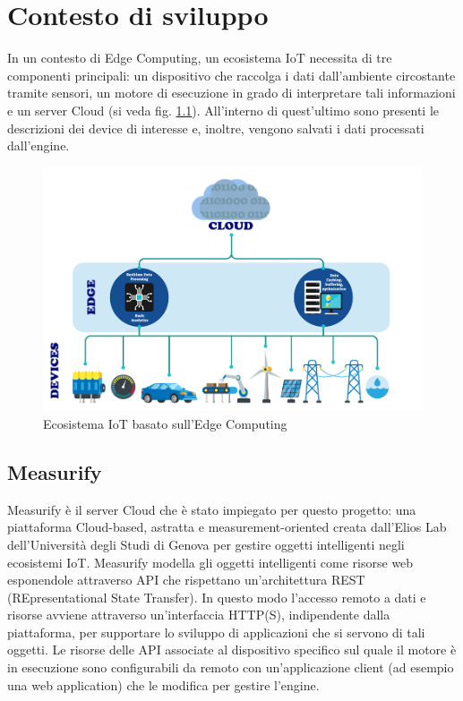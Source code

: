 \chapter{Contesto di sviluppo}
In un contesto di Edge Computing, un ecosistema IoT necessita di tre componenti principali: un dispositivo che raccolga i dati dall'ambiente circostante tramite sensori, un motore di esecuzione in grado di interpretare tali informazioni e un server Cloud (si veda fig. \ref{ecosistema}). All'interno di quest'ultimo sono presenti le descrizioni dei device di interesse e, inoltre, vengono salvati i dati processati dall'engine.

\begin{figure}[H]
	\centering
	\includegraphics[width=0.8\linewidth]{pics/edgestructure}
	\caption{Ecosistema IoT basato sull'Edge Computing}
	\label{ecosistema}
\end{figure}

\section{Measurify}
Measurify è il server Cloud che è stato impiegato per questo progetto: una piattaforma Cloud-based, astratta e measurement-oriented creata dall'Elios Lab dell'Università degli Studi di Genova per gestire oggetti intelligenti negli ecosistemi IoT. Measurify modella gli oggetti intelligenti come risorse web esponendole attraverso API che rispettano un'architettura REST (REpresentational State Transfer). In questo modo l'accesso remoto a dati e risorse avviene attraverso un'interfaccia HTTP(S), indipendente dalla piattaforma, per supportare lo sviluppo di applicazioni che si servono di tali oggetti. Le risorse delle API associate al dispositivo specifico sul quale il motore è in esecuzione sono configurabili da remoto con un'applicazione client (ad esempio una web application) che le modifica per gestire l'engine.


